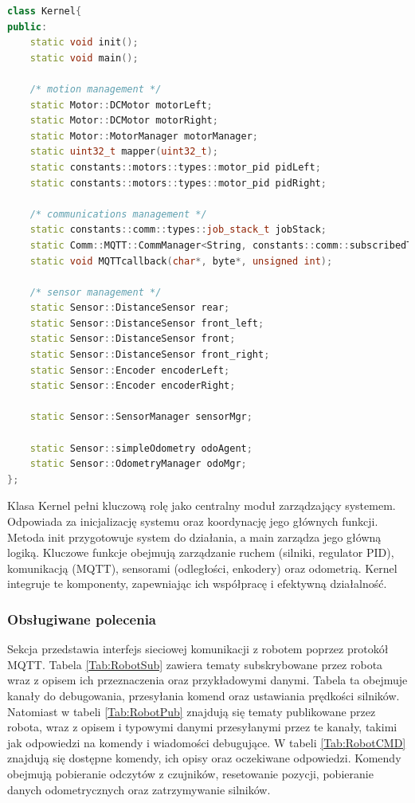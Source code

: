 \documentclass[12pt,twoside]{article}
\begin{document}
\begin{lstlisting}[language=C++, caption={Klasa Kernel}, label={lst:Kernel}]
class Kernel{
public:
    static void init();
    static void main();
    
    /* motion management */
    static Motor::DCMotor motorLeft;
    static Motor::DCMotor motorRight;
    static Motor::MotorManager motorManager;
    static uint32_t mapper(uint32_t);
    static constants::motors::types::motor_pid pidLeft;
    static constants::motors::types::motor_pid pidRight;

    /* communications management */
    static constants::comm::types::job_stack_t jobStack;
    static Comm::MQTT::CommManager<String, constants::comm::subscribedTopics> commMgr;
    static void MQTTcallback(char*, byte*, unsigned int);

    /* sensor management */
    static Sensor::DistanceSensor rear;
    static Sensor::DistanceSensor front_left;
    static Sensor::DistanceSensor front;
    static Sensor::DistanceSensor front_right;
    static Sensor::Encoder encoderLeft;
    static Sensor::Encoder encoderRight;

    static Sensor::SensorManager sensorMgr;

    static Sensor::simpleOdometry odoAgent;
    static Sensor::OdometryManager odoMgr;
};    
\end{lstlisting}

Klasa Kernel pełni kluczową rolę jako centralny moduł zarządzający systemem. Odpowiada za inicjalizację systemu oraz koordynację jego głównych funkcji. Metoda init przygotowuje system do działania, a main zarządza jego główną logiką. Kluczowe funkcje obejmują zarządzanie ruchem (silniki, regulator PID), komunikacją (MQTT), sensorami (odległości, enkodery) oraz odometrią. Kernel integruje te komponenty, zapewniając ich współpracę i efektywną działalność.

\subsubsection{Obsługiwane polecenia}

Sekcja przedstawia interfejs sieciowej komunikacji z robotem poprzez protokół MQTT. Tabela \ref{Tab:RobotSub} zawiera tematy subskrybowane przez robota wraz z opisem ich przeznaczenia oraz przykładowymi danymi. Tabela ta obejmuje kanały do debugowania, przesyłania komend oraz ustawiania prędkości silników. Natomiast w tabeli \ref{Tab:RobotPub} znajdują się tematy publikowane przez robota, wraz z opisem i typowymi danymi przesyłanymi przez te kanały, takimi jak odpowiedzi na komendy i wiadomości debugujące. W tabeli \ref{Tab:RobotCMD} znajdują się dostępne komendy, ich opisy oraz oczekiwane odpowiedzi. Komendy obejmują pobieranie odczytów z czujników, resetowanie pozycji, pobieranie danych odometrycznych oraz zatrzymywanie silników.
\end{document}
